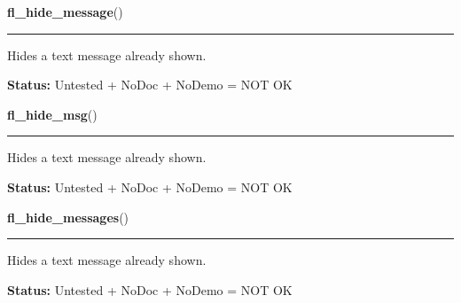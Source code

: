     \label{xformslib:library:fl_hide_message}

    \vspace{0.5ex}

\hspace{.8\funcindent}\begin{boxedminipage}{\funcwidth}

    \raggedright \textbf{fl\_hide\_message}()

    \vspace{-1.5ex}

    \rule{\textwidth}{0.5\fboxrule}
\setlength{\parskip}{2ex}
    Hides a text message already shown.

\setlength{\parskip}{1ex}
\textbf{Status:} Untested + NoDoc + NoDemo = NOT OK



    \end{boxedminipage}

    \label{xformslib:library:fl_hide_message}

    \vspace{0.5ex}

\hspace{.8\funcindent}\begin{boxedminipage}{\funcwidth}

    \raggedright \textbf{fl\_hide\_msg}()

    \vspace{-1.5ex}

    \rule{\textwidth}{0.5\fboxrule}
\setlength{\parskip}{2ex}
    Hides a text message already shown.

\setlength{\parskip}{1ex}
\textbf{Status:} Untested + NoDoc + NoDemo = NOT OK



    \end{boxedminipage}

    \label{xformslib:library:fl_hide_message}

    \vspace{0.5ex}

\hspace{.8\funcindent}\begin{boxedminipage}{\funcwidth}

    \raggedright \textbf{fl\_hide\_messages}()

    \vspace{-1.5ex}

    \rule{\textwidth}{0.5\fboxrule}
\setlength{\parskip}{2ex}
    Hides a text message already shown.

\setlength{\parskip}{1ex}
\textbf{Status:} Untested + NoDoc + NoDemo = NOT OK



    \end{boxedminipage}

